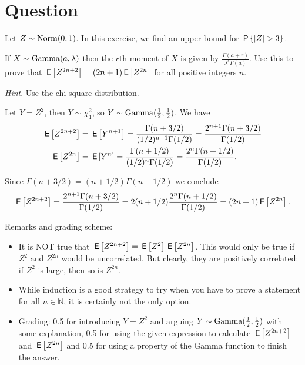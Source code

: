\section*{Question}

Let $Z \sim \Norm{0,1}$. 
In this exercise, we find an upper bound for $\P{|Z| > 3}$.

\begin{exercise}[1.5]
If $X \sim \Gamm{a, \lambda}$ then the $r$th moment of $X$ is given by $\frac{\Gamma(a+r)}{\lambda^r\Gamma(a)}$. 
Use this to prove that  $\E{Z^{2n+2}} = (2n+1)\E{Z^{2n}}$ for all positive integers $n$.

\textit{Hint}. Use the chi-square distribution. \\
\begin{solution}
Let $Y = Z^2$, then  $Y \sim \chi^2_1$, so $Y  \sim \Gamm{\tfrac12, \tfrac12}$. We have 
\begin{align*} \E{Z^{2n+2}} &= \E{Y^{n+1}} =  \frac{\Gamma(n+3/2)}{(1/2)^{n+1}\Gamma(1/2)} = \frac{2^{n+1}\Gamma(n+3/2)}{\Gamma(1/2)} \\ 
  \E{Z^{2n}} &= \E{Y^n}  =  \frac{\Gamma(n+1/2)}{(1/2)^n\Gamma(1/2)} = \frac{2^n\Gamma(n+1/2)}{\Gamma(1/2)}. \end{align*}

Since $\Gamma(n+3/2) = (n+1/2) \Gamma(n+1/2)$ we conclude $$\E{Z^{2n+2}} =  \frac{2^{n+1}\Gamma(n+3/2)}{\Gamma(1/2)} = 2(n+1/2)\frac{2^n\Gamma(n+1/2)}{\Gamma(1/2)} = (2n+1)\E{Z^{2n}}.$$  

\noindent Remarks and grading scheme:

\begin{itemize}
\item It is NOT true that $\E{Z^{2n+2}} = \E{Z^{2}}\E{Z^{2n}}$. This would only be true if $Z^2$ and $Z^{2n}$ would be uncorrelated. But clearly, they are positively correlated: if $Z^2$ is large, then so is $Z^{2n}$.
\item While induction is a good strategy to try when you have to prove a statement for all $n \in \mathbb N$, it is certainly not the only option. 
\item Grading: 0.5 for introducing $Y = Z^2$ and arguing $Y  \sim \Gamm{\tfrac12, \tfrac12}$ with some explanation, 0.5 for using the given expression to calculate  $\E{Z^{2n+2}}$ and $\E{Z^{2n}}$ and 0.5 for using a property of the Gamma function to finish the answer. 
\end{itemize}
\end{solution}
\end{exercise}

